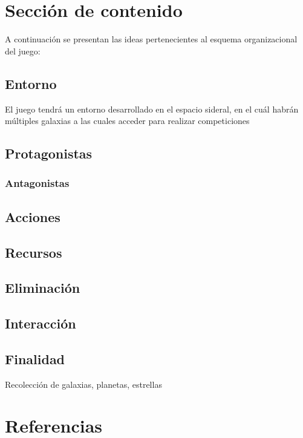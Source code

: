 \documentclass{article}
\begin{document}
\section{Sección de contenido} \label{contenido}
A continuación se presentan las ideas pertenecientes al esquema organizacional del juego:

\subsection{Entorno}
El juego tendrá un entorno desarrollado en el espacio sideral, en el cuál habrán múltiples galaxias a las cuales acceder para realizar competiciones 
\subsection{Protagonistas}

\subsubsection{Antagonistas}

\subsection{Acciones}

\subsection{Recursos}

\subsection{Eliminación}

\subsection{Interacción}

\subsection{Finalidad}
Recolección de galaxias, planetas, estrellas
\newpage
\section{Referencias}


\cite{calistenia}
\end{document}
